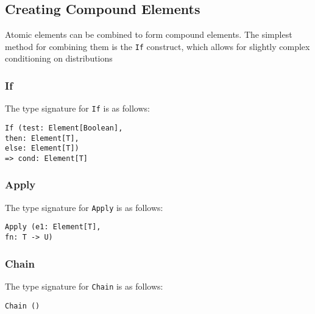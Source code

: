 \documentclass[12pt]{article}
\newcommand{\s}[1]{\texttt{#1}}
\begin{document}
\subsection{Creating Compound Elements}
Atomic elements can be combined to form compound elements. The
simplest method for combining them is the \s{If} construct, which
allows for slightly complex conditioning on distributions

\subsubsection{If}
The type signature for \s{If} is as follows:

\begin{center}
  \s{If (test: Element[Boolean], \\ then: Element[T], \\ else:
    Element[T])\\ => cond: Element[T]}
\end{center}

\subsubsection{Apply}
The type signature for \s{Apply} is as follows:
\begin{center}
  \s{Apply (e1: Element[T], \\ fn: T -> U)}
\end{center}

\subsubsection{Chain}
The type signature for \s{Chain} is as follows:
\begin{center}
  \s{Chain ()}
\end{center}
\end{document}
